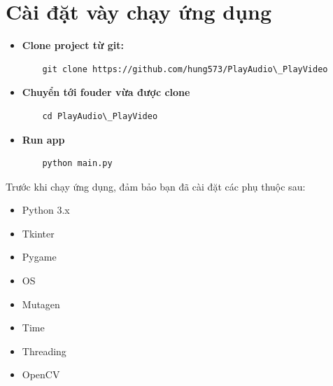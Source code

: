 \documentclass[a4paper]{article}
\begin{document}
\section{Cài đặt vày chạy ứng dụng}
\begin{itemize}
    \item \textbf{Clone project từ git:}     
    \begin{verbatim}
    git clone https://github.com/hung573/PlayAudio\_PlayVideo
    \end{verbatim} 
    \item \textbf{Chuyển tới fouder vừa được clone}     
    \begin{verbatim}
    cd PlayAudio\_PlayVideo
    \end{verbatim} 
    \item \textbf{Run app}     
    \begin{verbatim}
    python main.py
    \end{verbatim}
\end{itemize}
\hspace*{0.5cm}Trước khi chạy ứng dụng, đảm bảo bạn đã cài đặt các phụ thuộc sau:
\begin{itemize}
    \item Python 3.x
    \item Tkinter
    \item Pygame
    \item OS
    \item Mutagen
    \item Time
    \item Threading
    \item OpenCV
\end{itemize}
\end{document}
